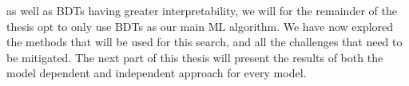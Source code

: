 \documentclass[12pt, a4paper]{book}
\begin{document}
as well as BDTs having greater interpretability, we will for the remainder of the thesis opt to only use BDTs as our main ML algorithm. We have now explored the methods that will be used for this search, and all the challenges that need to be mitigated. The next part of this thesis will present 
the results of both the model dependent and independent approach for every model. 
\end{document}
